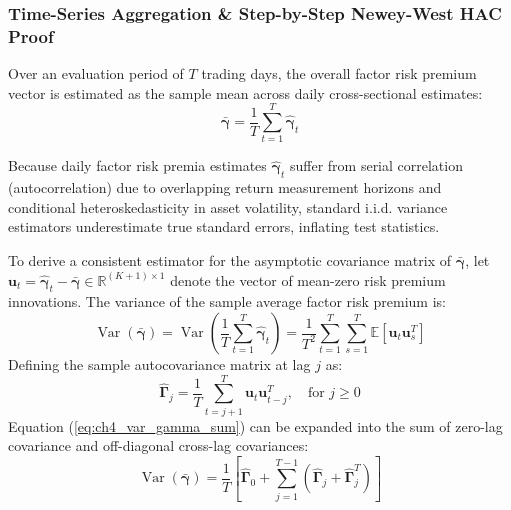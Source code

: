 \subsubsection{Time-Series Aggregation \& Step-by-Step Newey-West HAC Proof}
Over an evaluation period of $T$ trading days, the overall factor risk premium vector is estimated as the sample mean across daily cross-sectional estimates:
\begin{equation}
\bar{\boldsymbol{\gamma}} = \frac{1}{T} \sum_{t=1}^T \hat{\boldsymbol{\gamma}}_t
\end{equation}

Because daily factor risk premia estimates $\hat{\boldsymbol{\gamma}}_t$ suffer from serial correlation (autocorrelation) due to overlapping return measurement horizons and conditional heteroskedasticity in asset volatility, standard i.i.d. variance estimators underestimate true standard errors, inflating test statistics.

To derive a consistent estimator for the asymptotic covariance matrix of $\bar{\boldsymbol{\gamma}}$, let $\mathbf{u}_t = \hat{\boldsymbol{\gamma}}_t - \bar{\boldsymbol{\gamma}} \in \mathbb{R}^{(K+1) \times 1}$ denote the vector of mean-zero risk premium innovations. The variance of the sample average factor risk premium is:
\begin{equation}
\operatorname{Var}(\bar{\boldsymbol{\gamma}}) = \operatorname{Var}\left( \frac{1}{T} \sum_{t=1}^T \hat{\boldsymbol{\gamma}}_t \right) = \frac{1}{T^2} \sum_{t=1}^T \sum_{s=1}^T \mathbb{E}\left[ \mathbf{u}_t \mathbf{u}_s^T \right]
\label{eq:ch4_var_gamma_sum}
\end{equation}
Defining the sample autocovariance matrix at lag $j$ as:
\begin{equation}
\hat{\mathbf{\Gamma}}_j = \frac{1}{T} \sum_{t=j+1}^T \mathbf{u}_t \mathbf{u}_{t-j}^T, \quad \text{for } j \ge 0
\label{eq:ch4_autocovariance}
\end{equation}
Equation (\ref{eq:ch4_var_gamma_sum}) can be expanded into the sum of zero-lag covariance and off-diagonal cross-lag covariances:
\begin{equation}
\operatorname{Var}(\bar{\boldsymbol{\gamma}}) = \frac{1}{T} \left[ \hat{\mathbf{\Gamma}}_0 + \sum_{j=1}^{T-1} \left( \hat{\mathbf{\Gamma}}_j + \hat{\mathbf{\Gamma}}_j^T \right) \right]
\end{equation}

